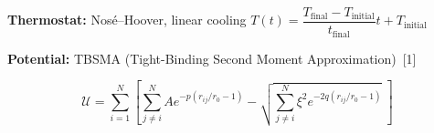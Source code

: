 {{\begin{center}
\begin{tikzpicture}[x=\linewidth, y=1cm,
            parambox/.style={rounded corners=4pt, minimum height=1.4cm, text width=0.38\linewidth, align=center, font=\small}]
        \end{tikzpicture}
    \end{center}

    \vspace{0.5cm}

    \textbf{Thermostat:} Nos\'e--Hoover, linear cooling \quad
    $T(t) = \dfrac{T_{\text{final}} - T_\text{initial}}{t_{\text{final}}}t + T_\text{initial}$

    \vspace{0.5cm}

    \textbf{Potential:} TBSMA (Tight-Binding Second Moment Approximation)~[1]

    \vspace{0.5cm}

    \begin{equation}
        \mathcal{U} = \sum^N_{i=1} \left[\sum_{j\ne i}^NAe^{-p(r_{ij}/r_0 - 1)} -\sqrt{\sum_{j\ne i}^N\xi^2e^{-2q(r_{ij}/r_0 - 1)}}~\right]
    \end{equation}
    
    \vspace{1.3cm}
}
}
